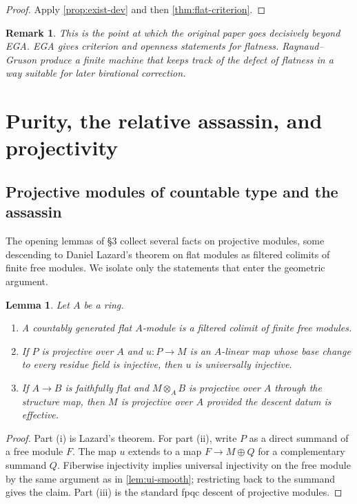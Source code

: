 \documentclass[11pt,oneside]{article}
\newtheorem{lemma}[theorem]{Lemma}
\newtheorem{remark}[theorem]{Remark}
\newcommand{\ot}{\otimes}
\begin{document}
\begin{proof}
Apply \cref{prop:exist-dev} and then \cref{thm:flat-criterion}.
\end{proof}

\begin{remark}
This is the point at which the original paper goes decisively beyond EGA.  EGA gives criterion and openness statements for flatness.  Raynaud--Gruson produce a finite machine that keeps track of the defect of flatness in a way suitable for later birational correction.
\end{remark}

\section{Purity, the relative assassin, and projectivity}

\subsection{Projective modules of countable type and the assassin}

The opening lemmas of \S3 collect several facts on projective modules, some descending to Daniel Lazard's theorem on flat modules as filtered colimits of finite free modules.  We isolate only the statements that enter the geometric argument.

\begin{lemma}\label{lem:proj-loc}
Let $A$ be a ring.
\begin{enumerate}[label=\textup{(\roman*)}]
  \item A countably generated flat $A$-module is a filtered colimit of finite free modules.
  \item If $P$ is projective over $A$ and $u\colon P\to M$ is an $A$-linear map whose base change to every residue field is injective, then $u$ is universally injective.
  \item If $A\to B$ is faithfully flat and $M\ot_A B$ is projective over $A$ through the structure map, then $M$ is projective over $A$ provided the descent datum is effective.
\end{enumerate}
\end{lemma}

\begin{proof}
Part \textup{(i)} is Lazard's theorem.  For part \textup{(ii)}, write $P$ as a direct summand of a free module $F$.  The map $u$ extends to a map $F\to M\oplus Q$ for a complementary summand $Q$.  Fiberwise injectivity implies universal injectivity on the free module by the same argument as in \cref{lem:ui-smooth}; restricting back to the summand gives the claim.  Part \textup{(iii)} is the standard fpqc descent of projective modules.
\end{proof}
\end{document}
